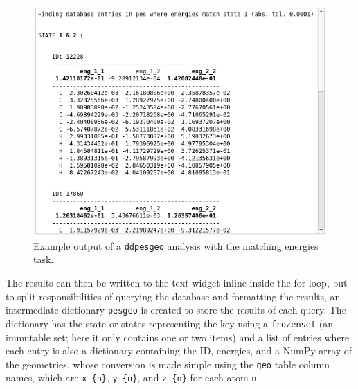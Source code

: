 \documentclass[12pt]{article}
\begin{document}
\begin{figure}
    \includegraphics[width=\linewidth]{img/ddpesgeo.png} 
    \caption{Example output of a \texttt{ddpesgeo} analysis with the matching energies task.}
    \label{fig:ddpesgeo}
    \end{figure}

The results can then be written to the text widget inline inside the for loop, but to split responsibilities of querying the database and formatting the results, an intermediate dictionary \texttt{pesgeo} is created to store the results of each query. The dictionary has the state or states representing the key using a \texttt{frozenset} (an immutable set; here it only contains one or two items) and a list of entries where each entry is also a dictionary containing the ID, energies, and a NumPy array of the geometries, whose conversion is made simple using the \texttt{geo} table column names, which are \texttt{x\_\{n\}}, \texttt{y\_\{n\}}, and \texttt{z\_\{n\}} for each atom \texttt{n}.
\end{document}
